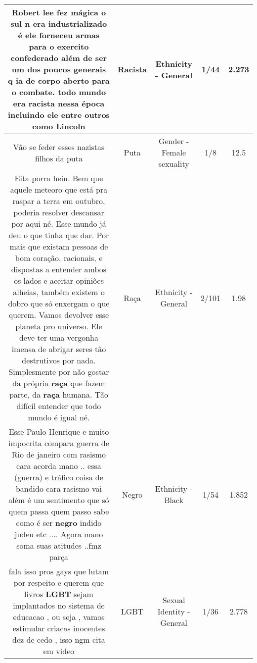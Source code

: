 \documentclass[11pt]{article}
\newlength\mylength
\begin{document}
\begin{center}
\begin{longtable}{|C{.65\mylength}|C{.30\mylength}|C{.12\mylength}|C{.12\mylength}|C{.12\mylength}|}
  \small Robert lee fez mágica o sul n era industrializado é ele forneceu armas  para o  exercito confederado além de ser um dos poucos generais q ia de corpo aberto para o combate. todo mundo era \textbf{racista} nessa época incluindo ele entre outros como Lincoln\normalsize   & Racista & Ethnicity - General & 1/44 & 2.273 \\  \hline
  \small Vão se feder esses nazistas filhos da puta\normalsize   & Puta & Gender - Female sexuality & 1/8 & 12.5 \\  \hline
  \small Eita porra hein. Bem que aquele meteoro que está pra raspar a terra em outubro, poderia resolver descansar por aqui né. Esse mundo já deu o que tinha que dar. Por mais que existam pessoas de bom coração, racionais, e dispostas a entender ambos os lados e aceitar opiniões alheias, também existem o dobro que só enxergam o que querem. Vamos devolver esse planeta pro universo. Ele deve ter uma vergonha imensa de abrigar seres tão destrutivos por nada. Simplesmente por não gostar da própria \textbf{raça} que fazem parte, da \textbf{raça} humana. Tão difícil entender que todo mundo é igual né.\normalsize   & Raça & Ethnicity - General & 2/101 & 1.98 \\  \hline
  \small Esse Paulo Henrique e muito impocrita compara guerra de Rio de janeiro com rasismo cara acorda mano .. essa (guerra) e tráfico coisa de bandido cara rasismo vai além é um sentimento que só quem passa quem passo sabe como é ser \textbf{negro} indido judeu etc .... Agora mano soma suas atitudes ..fmz parça\normalsize   & Negro & Ethnicity - Black & 1/54 & 1.852 \\  \hline
  \small fala isso pros gays que lutam por respeito e querem que livros \textbf{LGBT} sejam implantados no sistema de educacao , ou seja , vamos estimular criacas inocentes dez de cedo , isso ngm cita em video\normalsize   & LGBT & Sexual Identity - General & 1/36 & 2.778 \\  \hline

\end{longtable}
\end{center}
\end{document}

